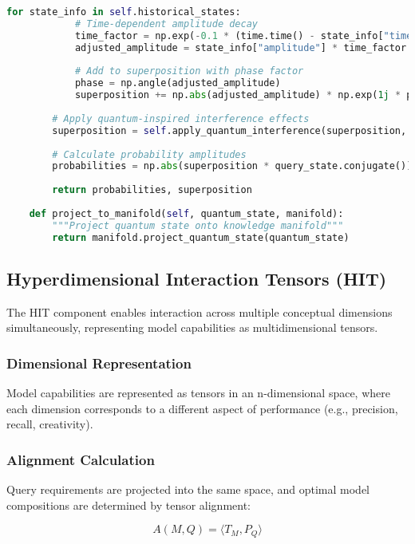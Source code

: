 \documentclass[journal,onecolumn]{IEEEtran}
\begin{document}
\begin{lstlisting}[language=Python, caption=QITS Implementation Pseudocode]
        for state_info in self.historical_states:
            # Time-dependent amplitude decay
            time_factor = np.exp(-0.1 * (time.time() - state_info["timestamp"]))
            adjusted_amplitude = state_info["amplitude"] * time_factor
            
            # Add to superposition with phase factor
            phase = np.angle(adjusted_amplitude)
            superposition += np.abs(adjusted_amplitude) * np.exp(1j * phase) * state_info["state"]
        
        # Apply quantum-inspired interference effects
        superposition = self.apply_quantum_interference(superposition, query_state)
        
        # Calculate probability amplitudes
        probabilities = np.abs(superposition * query_state.conjugate())**2
        
        return probabilities, superposition
        
    def project_to_manifold(self, quantum_state, manifold):
        """Project quantum state onto knowledge manifold"""
        return manifold.project_quantum_state(quantum_state)
\end{lstlisting}

\subsection{Hyperdimensional Interaction Tensors (HIT)}

The HIT component enables interaction across multiple conceptual dimensions simultaneously, representing model capabilities as multidimensional tensors.

\subsubsection{Dimensional Representation}

Model capabilities are represented as tensors in an n-dimensional space, where each dimension corresponds to a different aspect of performance (e.g., precision, recall, creativity).

\subsubsection{Alignment Calculation}

Query requirements are projected into the same space, and optimal model compositions are determined by tensor alignment:

\begin{equation}
A(M,Q) = \langle T_M, P_Q \rangle
\end{equation}
\end{document}
